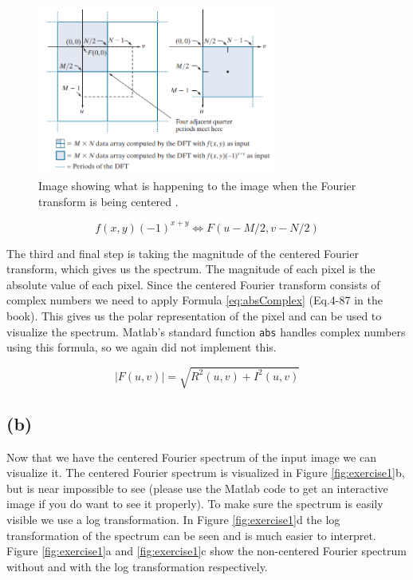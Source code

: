 \documentclass{article}
\begin{document}
\begin{figure}[ht]
    \centering
    \includegraphics[width=0.7\textwidth]{Assignment_2/output_plots/centered_fourier_spectrum_book.png}
    \caption{Image showing what is happening to the image when the Fourier transform is being centered \cite{gonzalez2008digital}.}
    \label{fig:fouriershiftFromBook}
\end{figure}

\begin{equation}\label{eq:fouriershift}
    f(x, y)(-1)^{x+y} \Leftrightarrow F(u-M / 2, v-N / 2)
\end{equation}

The third and final step is taking the magnitude of the centered Fourier transform, which gives us the spectrum. The magnitude of each pixel is the absolute value of each pixel. Since the centered Fourier transform consists of complex numbers we need to apply Formula \ref{eq:absComplex} (Eq.4-87 in the book). This gives us the polar representation of the pixel and can be used to visualize the spectrum. Matlab's standard function \texttt{abs} handles complex numbers using this formula, so we again did not implement this.

\begin{equation}\label{eq:absComplex}
    |F(u, v)|=\sqrt{R^{2}(u, v)+I^{2}(u, v)}
\end{equation}

\newpage
\subsection*{(b)}
Now that we have the centered Fourier spectrum of the input image we can visualize it. The centered Fourier spectrum is visualized in Figure \ref{fig:exercise1}b, but is near impossible to see (please use the Matlab code to get an interactive image if you do want to see it properly). To make sure the spectrum is easily visible we use a log transformation. In Figure \ref{fig:exercise1}d the log transformation of the spectrum can be seen and is much easier to interpret. Figure \ref{fig:exercise1}a and \ref{fig:exercise1}c show the non-centered Fourier spectrum without and with the log transformation respectively.
\end{document}
